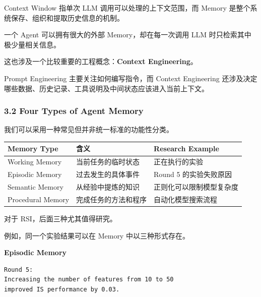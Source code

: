 Context Window 指单次 LLM 调用可以处理的上下文范围，而 Memory 是整个系统保存、组织和提取历史信息的机制。

一个 Agent 可以拥有很大的外部 Memory，却在每一次调用 LLM 时只检索其中极少量相关信息。


这也涉及一个比较重要的工程概念：\textbf{Context Engineering}。

Prompt Engineering 主要关注如何编写指令，而 Context Engineering 还涉及决定哪些数据、历史记录、工具说明及中间状态应该进入当前上下文。

\hypertarget{part-3-34-0001-four-types-of-agent-memory}{%
\subsubsection{3.2 Four Types of Agent Memory}\label{part-3-34-0001-four-types-of-agent-memory}}

我们可以采用一种常见但并非统一标准的功能性分类。

\begin{readertable}
\begin{longtable}[]{@{}
  >{\raggedright\arraybackslash}p{}
  >{\raggedright\arraybackslash}p{}
  >{\raggedright\arraybackslash}p{}@{}}
\toprule
Memory Type & 含义 & Research Example \\
\midrule
\endhead
Working Memory & 当前任务的临时状态 & 正在执行的实验 \\
Episodic Memory & 过去发生的具体事件 & Round 5 的实验失败原因 \\
Semantic Memory & 从经验中提炼的知识 & 正则化可以限制模型复杂度 \\
Procedural Memory & 完成任务的方法和程序 & 自动化模型搜索流程 \\
\bottomrule
\end{longtable}
\end{readertable}

对于 RSI，后面三种尤其值得研究。

例如，同一个实验结果可以在 Memory 中以三种形式存在。

\textbf{Episodic Memory}

\begin{verbatim}
Round 5:
Increasing the number of features from 10 to 50
improved IS performance by 0.03.
\end{verbatim}

